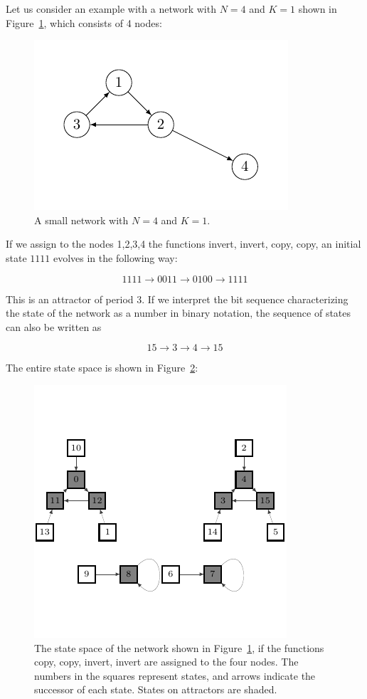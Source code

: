 \documentclass[11pt]{article}
\begin{document}
Let us consider an example with a network with $N=4$
and $K = 1$  shown in Figure~\ref{fig:rb2}, which consists of 4
nodes:

\begin{figure}[h]
\centering
\includegraphics[scale=1]{figurenetworks2.pdf}
\caption{A small network with $N=4$ and $K=1$.}
\label{fig:rb2}
\end{figure}

If we assign to the nodes 1,2,3,4 the functions invert,
invert, copy, copy, an initial state $1111$ evolves in the
following way:

$$
1111 \to 0011 \to 0100 \to 1111
$$

This is an attractor of period 3. If we interpret the bit sequence characterizing the state of the network as a number in binary notation, the sequence of states can also be
written as

$$
15 \to 3 \to 4 \to 15
$$

The entire state space is shown in Figure~\ref{fig:rb3}:
\begin{figure}[h]
\centering
\includegraphics[scale=1]{fg3.pdf}
\caption{The state space of the network shown in Figure~\ref{fig:rb2}, if
the functions copy, copy, invert, invert are assigned to the four
nodes. The numbers in the squares represent states, and arrows indicate the successor of each state. States on attractors
are shaded.}
\label{fig:rb3}
\end{figure}
\end{document}
